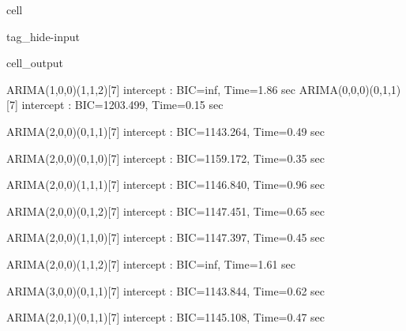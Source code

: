 \documentclass[letterpaper,10pt,english]{jupyterBook}
\begin{document}
\begin{sphinxuseclass}{cell}
\begin{sphinxuseclass}{tag_hide-input}
\begin{sphinxuseclass}{cell_output}
\begin{sphinxVerbatim}[commandchars=\\\{\}]
 ARIMA(1,0,0)(1,1,2)[7] intercept   : BIC=inf, Time=1.86 sec
 ARIMA(0,0,0)(0,1,1)[7] intercept   : BIC=1203.499, Time=0.15 sec
\end{sphinxVerbatim}

\begin{sphinxVerbatim}[commandchars=\\\{\}]
 ARIMA(2,0,0)(0,1,1)[7] intercept   : BIC=1143.264, Time=0.49 sec
\end{sphinxVerbatim}

\begin{sphinxVerbatim}[commandchars=\\\{\}]
 ARIMA(2,0,0)(0,1,0)[7] intercept   : BIC=1159.172, Time=0.35 sec
\end{sphinxVerbatim}

\begin{sphinxVerbatim}[commandchars=\\\{\}]
 ARIMA(2,0,0)(1,1,1)[7] intercept   : BIC=1146.840, Time=0.96 sec
\end{sphinxVerbatim}

\begin{sphinxVerbatim}[commandchars=\\\{\}]
 ARIMA(2,0,0)(0,1,2)[7] intercept   : BIC=1147.451, Time=0.65 sec
\end{sphinxVerbatim}

\begin{sphinxVerbatim}[commandchars=\\\{\}]
 ARIMA(2,0,0)(1,1,0)[7] intercept   : BIC=1147.397, Time=0.45 sec
\end{sphinxVerbatim}

\begin{sphinxVerbatim}[commandchars=\\\{\}]
 ARIMA(2,0,0)(1,1,2)[7] intercept   : BIC=inf, Time=1.61 sec
\end{sphinxVerbatim}

\begin{sphinxVerbatim}[commandchars=\\\{\}]
 ARIMA(3,0,0)(0,1,1)[7] intercept   : BIC=1143.844, Time=0.62 sec
\end{sphinxVerbatim}

\begin{sphinxVerbatim}[commandchars=\\\{\}]
 ARIMA(2,0,1)(0,1,1)[7] intercept   : BIC=1145.108, Time=0.47 sec
\end{sphinxVerbatim}


\end{sphinxuseclass}
\end{sphinxuseclass}
\end{sphinxuseclass}
\end{document}
